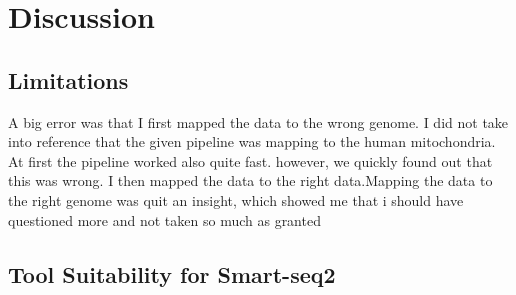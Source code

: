 
\chapter{Discussion}

\label{Chapter4} 

\section{Limitations}



A big error was that I first mapped the data to the wrong genome. I did not take into reference that the given pipeline was mapping to the human mitochondria. At first the pipeline worked also quite fast. however, we quickly found out that this was wrong. I then mapped the data to the right data.Mapping the data to the right genome was quit an insight, which showed me that i should have questioned more and not taken so much as granted




\section{Tool Suitability for Smart-seq2}

